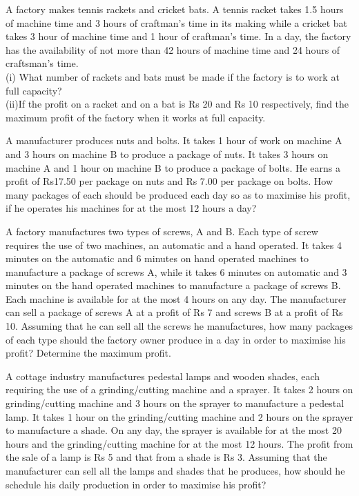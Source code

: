 \item A factory makes tennis rackets and cricket bats. A tennis racket takes 1.5 hours
of machine time and 3 hours of craftman’s time in its making while a cricket bat
takes 3 hour of machine time and 1 hour of craftman’s time. In a day, the factory
has the availability of not more than 42 hours of machine time and 24 hours of
craftsman’s time.\\
(i) What number of rackets and bats must be made if the factory is to work
at full capacity?\\
(ii)If the profit on a racket and on a bat is Rs 20 and Rs 10 respectively, find
the maximum profit of the factory when it works at full capacity.\\
\solution


\item A manufacturer produces nuts and bolts. It takes 1 hour of work on machine A
and 3 hours on machine B to produce a package of nuts. It takes 3 hours on
machine A and 1 hour on machine B to produce a package of bolts. He earns a
profit of Rs17.50 per package on nuts and Rs 7.00 per package on bolts. How
many packages of each should be produced each day so as to maximise his
profit, if he operates his machines for at the most 12 hours a day?\\
\solution


\item A factory manufactures two types of screws, A and B. Each type of screw
requires the use of two machines, an automatic and a hand operated. It takes
4 minutes on the automatic and 6 minutes on hand operated machines to
manufacture a package of screws A, while it takes 6 minutes on automatic and
3 minutes on the hand operated machines to manufacture a package of screws
B. Each machine is available for at the most 4 hours on any day. The manufacturer
can sell a package of screws A at a profit of Rs 7 and screws B at a profit of
Rs 10. Assuming that he can sell all the screws he manufactures, how many
packages of each type should the factory owner produce in a day in order to
maximise his profit? Determine the maximum profit.\\
\solution


\item A cottage industry manufactures pedestal lamps and wooden shades, each
requiring the use of a grinding/cutting machine and a sprayer. It takes 2 hours on
grinding/cutting machine and 3 hours on the sprayer to manufacture a pedestal
lamp. It takes 1 hour on the grinding/cutting machine and 2 hours on the sprayer
to manufacture a shade. On any day, the sprayer is available for at the most 20
hours and the grinding/cutting machine for at the most 12 hours. The profit from
the sale of a lamp is Rs 5 and that from a shade is Rs 3. Assuming that the
manufacturer can sell all the lamps and shades that he produces, how should he
schedule his daily production in order to maximise his profit?\\
\solution



